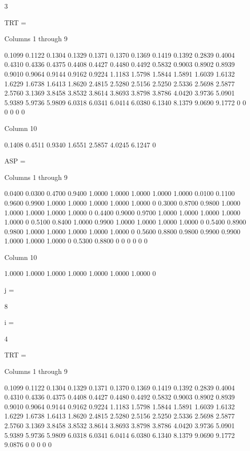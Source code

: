      3


TRT =

  Columns 1 through 9

    0.1099    0.1122    0.1304    0.1329    0.1371    0.1370    0.1369    0.1419    0.1392
    0.2839    0.4004    0.4310    0.4336    0.4375    0.4408    0.4427    0.4480    0.4492
    0.5832    0.9003    0.8902    0.8939    0.9010    0.9064    0.9144    0.9162    0.9224
    1.1183    1.5798    1.5844    1.5891    1.6039    1.6132    1.6229    1.6738    1.6413
    1.8620    2.4815    2.5280    2.5156    2.5250    2.5336    2.5698    2.5877    2.5760
    3.1369    3.8458    3.8532    3.8614    3.8693    3.8798    3.8786    4.0420    3.9736
    5.0901    5.9389    5.9736    5.9809    6.0318    6.0341    6.0414    6.0380    6.1340
    8.1379    9.0690    9.1772         0         0         0         0         0         0

  Column 10

    0.1408
    0.4511
    0.9340
    1.6551
    2.5857
    4.0245
    6.1247
         0


ASP =

  Columns 1 through 9

    0.0400    0.0300    0.4700    0.9400    1.0000    1.0000    1.0000    1.0000    1.0000
    0.0100    0.1100    0.9600    0.9900    1.0000    1.0000    1.0000    1.0000    1.0000
         0    0.3000    0.8700    0.9800    1.0000    1.0000    1.0000    1.0000    1.0000
         0    0.4400    0.9000    0.9700    1.0000    1.0000    1.0000    1.0000    1.0000
         0    0.5100    0.8400    1.0000    0.9900    1.0000    1.0000    1.0000    1.0000
         0    0.5400    0.8900    0.9800    1.0000    1.0000    1.0000    1.0000    1.0000
         0    0.5600    0.8800    0.9800    0.9900    0.9900    1.0000    1.0000    1.0000
         0    0.5300    0.8800         0         0         0         0         0         0

  Column 10

    1.0000
    1.0000
    1.0000
    1.0000
    1.0000
    1.0000
    1.0000
         0


j =

     8


i =

     4


TRT =

  Columns 1 through 9

    0.1099    0.1122    0.1304    0.1329    0.1371    0.1370    0.1369    0.1419    0.1392
    0.2839    0.4004    0.4310    0.4336    0.4375    0.4408    0.4427    0.4480    0.4492
    0.5832    0.9003    0.8902    0.8939    0.9010    0.9064    0.9144    0.9162    0.9224
    1.1183    1.5798    1.5844    1.5891    1.6039    1.6132    1.6229    1.6738    1.6413
    1.8620    2.4815    2.5280    2.5156    2.5250    2.5336    2.5698    2.5877    2.5760
    3.1369    3.8458    3.8532    3.8614    3.8693    3.8798    3.8786    4.0420    3.9736
    5.0901    5.9389    5.9736    5.9809    6.0318    6.0341    6.0414    6.0380    6.1340
    8.1379    9.0690    9.1772    9.0876         0         0         0         0         0

